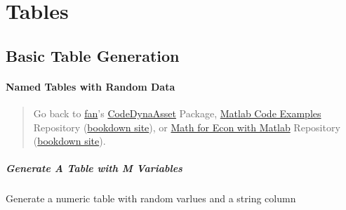 \documentclass[
]{book}
\begin{document}
\hypertarget{tables}{%
\chapter{Tables}\label{tables}}

\hypertarget{basic-table-generation}{%
\section{Basic Table Generation}\label{basic-table-generation}}

\hypertarget{named-tables-with-random-data}{%
\subsubsection{Named Tables with Random Data}\label{named-tables-with-random-data}}

\begin{quote}
Go back to \href{http://fanwangecon.github.io/}{fan}'s \href{https://fanwangecon.github.io/CodeDynaAsset/}{CodeDynaAsset} Package, \href{https://fanwangecon.github.io/M4Econ/}{Matlab Code Examples} Repository (\href{https://fanwangecon.github.io/M4Econ/bookdown}{bookdown site}), or \href{https://fanwangecon.github.io/Math4Econ/}{Math for Econ with Matlab} Repository (\href{https://fanwangecon.github.io/Math4Econ/bookdown}{bookdown site}).
\end{quote}

\hypertarget{generate-a-table-with-m-variables}{%
\paragraph{Generate A Table with M Variables}\label{generate-a-table-with-m-variables}}

Generate a numeric table with random varlues and a string column
\end{document}
